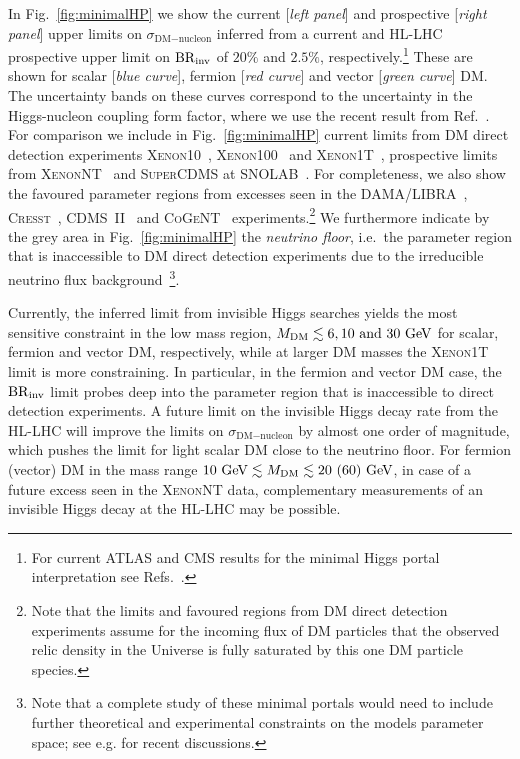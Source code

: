 \documentclass[../report.tex]{subfiles}
\begin{document}
In Fig.~\ref{fig:minimalHP} we show the current [\emph{left panel}] and prospective [\emph{right panel}] upper limits on $\sigma_{\text{DM}-\text{nucleon}}$ inferred from a current and HL-LHC prospective upper limit on $\mathrm{BR}_\mathrm{inv}$ of $20\%$ and $2.5\%$, respectively.\footnote{For current  ATLAS and CMS results for the minimal Higgs portal interpretation see Refs.~\cite{Aad:2015pla,Khachatryan:2016whc,Aaboud:2018sfi,Sirunyan:2018owy,ATLAS-CONF-2018-054}.} These are shown for scalar [\emph{blue curve}], fermion [\emph{red curve}]  and vector [\emph{green curve}] DM. The uncertainty bands on these curves correspond to the uncertainty in the Higgs-nucleon coupling form factor, where we use the recent result from Ref.~\cite{Hoferichter:2017olk}. For comparison we include in Fig.~\ref{fig:minimalHP} current limits from DM direct detection experiments \textsc{Xenon10}~\cite{Angle:2011th}, \textsc{Xenon100}~\cite{Aprile:2012nq} and \textsc{Xenon1T}~\cite{Aprile:2018dbl}, prospective limits from \textsc{XenonNT}~\cite{Aprile:2015uzo} and \textsc{SuperCDMS} at SNOLAB~\cite{Agnese:2016cpb}. For completeness, we also show the favoured parameter regions from excesses seen in the \textsc{DAMA/LIBRA}~\cite{Savage:2008er}, \textsc{Cresst}~\cite{Angloher:2011uu}, \textsc{CDMS~II}~\cite{Agnese:2013rvf} and \textsc{CoGeNT}~\cite{Aalseth:2012if} experiments.\footnote{Note that the limits and favoured regions from DM direct detection experiments assume for the incoming flux of DM particles that the observed relic density in the Universe is fully saturated by this one DM particle species.} We furthermore indicate by the grey area in Fig.~\ref{fig:minimalHP} the \emph{neutrino floor}, i.e.~the parameter region that is inaccessible to DM direct detection experiments due to the irreducible neutrino flux background~\cite{Billard:2013qya}\footnote{Note that a complete study of these minimal portals would need to include further theoretical and experimental constraints on the models parameter space; see e.g. \cite{Athron:2017kgt,Athron:2018hpc} for recent discussions.}.

Currently, the inferred limit from invisible Higgs searches yields the most sensitive constraint in the low mass region, $M_\text{DM} \lesssim 6, 10~\mbox{and}~30~\text{GeV}$ for scalar, fermion and vector DM, respectively, while at larger DM masses the \textsc{Xenon1T} limit is more constraining. In particular, in the fermion and vector DM case, the $\mathrm{BR}_\mathrm{inv}$ limit probes deep into the parameter region that is inaccessible to direct detection experiments. A future limit on the invisible Higgs decay rate from the HL-LHC will improve the limits on $\sigma_{\text{DM}-\text{nucleon}}$ by almost one order of magnitude, which pushes the limit for light scalar DM close to the neutrino floor. For fermion (vector) DM in the mass range $10~\text{GeV} \lesssim M_{\text{DM}} \lesssim 20~(60)~\text{GeV}$, in case of a future excess seen in the \textsc{XenonNT} data, complementary measurements of an invisible Higgs decay at the HL-LHC may be possible. 
\end{document}
